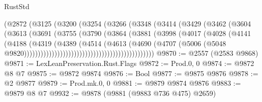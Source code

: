 \begin{lexlean}{RustStd}
\begin{coremodule}
                                        (@2872
                                          (@3125
                                            (@3200
                                              (@3254
                                                (@3266
                                                  (@3348
                                                    (@3414
                                                      (@3429
                                                        (@3462
                                                          (@3604
                                                            (@3613
                                                              (@3691
                                                                (@3755
                                                                  (@3790
                                                                    (@3864
                                                                      (@3881
                                                                        (@3998
                                                                          (@4017
                                                                            (@4028
                                                                              (@4141
                                                                                (@4188
                                                                                  (@4319
                                                                                    (@4389
                                                                                      (@4514
                                                                                        (@4613
                                                                                          (@4690
                                                                                            (@4707
                                                                                              (@5006
                                                                                                (@5048
                                                                                                  @9820)))))))))))))))))))))))))))))))))))))))))))))))
@9870 := @2557 (@2583 @9868)
@9871 := LexLeanPreservation.Rust.Flags
@9872 := Prod.{0, 0}
@9874 := @9872 @8 @7
@9875 := @9872 @9874
@9876 := Bool
@9877 := @9875 @9876
@9878 := @2 @9877
@9879 := Prod.mk.{0, 0}
@9881 := @9879 @9874 @9876
@9883 := @9879 @8 @7
@9932 := @9878
    (@9881 (@9883 @736 @475) @2659)

\end{coremodule}
\end{lexlean}

